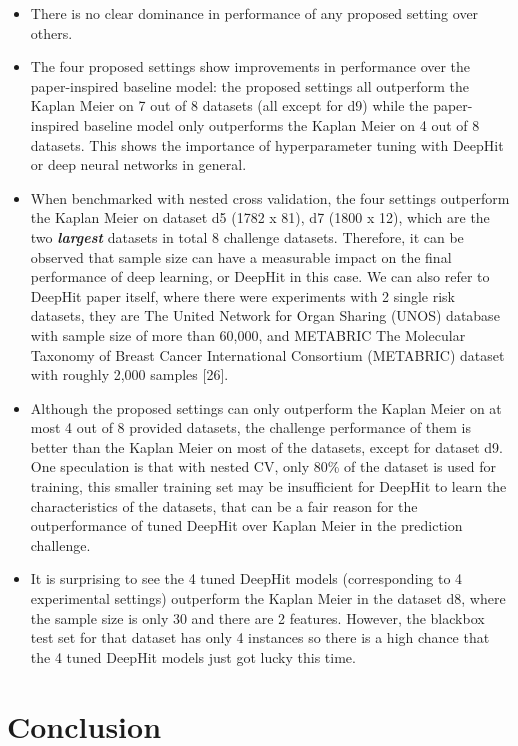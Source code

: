 \documentclass[
]{article}
\providecommand{\tightlist}{%
  \setlength{\itemsep}{0pt}\setlength{\parskip}{0pt}}
\begin{document}
\begin{itemize}
\tightlist
\item
  There is no clear dominance in performance of any proposed setting over others.
\item
  The four proposed settings show improvements in performance over the paper-inspired baseline model: the proposed settings all outperform the Kaplan Meier on 7 out of 8 datasets (all except for d9) while the paper-inspired baseline model only outperforms the Kaplan Meier on 4 out of 8 datasets. This shows the importance of hyperparameter tuning with DeepHit or deep neural networks in general.
\item
  When benchmarked with nested cross validation, the four settings outperform the Kaplan Meier on dataset d5 (1782 x 81), d7 (1800 x 12), which are the two \textbf{\emph{largest}} datasets in total 8 challenge datasets. Therefore, it can be observed that sample size can have a measurable impact on the final performance of deep learning, or DeepHit in this case. We can also refer to DeepHit paper itself, where there were experiments with 2 single risk datasets, they are The United Network for Organ Sharing (UNOS) database with sample size of more than 60,000, and METABRIC The Molecular Taxonomy of Breast Cancer International Consortium (METABRIC) dataset with roughly 2,000 samples {[}26{]}.
\item
  Although the proposed settings can only outperform the Kaplan Meier on at most 4 out of 8 provided datasets, the challenge performance of them is better than the Kaplan Meier on most of the datasets, except for dataset d9. One speculation is that with nested CV, only 80\% of the dataset is used for training, this smaller training set may be insufficient for DeepHit to learn the characteristics of the datasets, that can be a fair reason for the outperformance of tuned DeepHit over Kaplan Meier in the prediction challenge.
\item
  It is surprising to see the 4 tuned DeepHit models (corresponding to 4 experimental settings) outperform the Kaplan Meier in the dataset d8, where the sample size is only 30 and there are 2 features. However, the blackbox test set for that dataset has only 4 instances so there is a high chance that the 4 tuned DeepHit models just got lucky this time.
\end{itemize}

\hypertarget{conclusion}{%
\section{Conclusion}\label{conclusion}}
\end{document}

